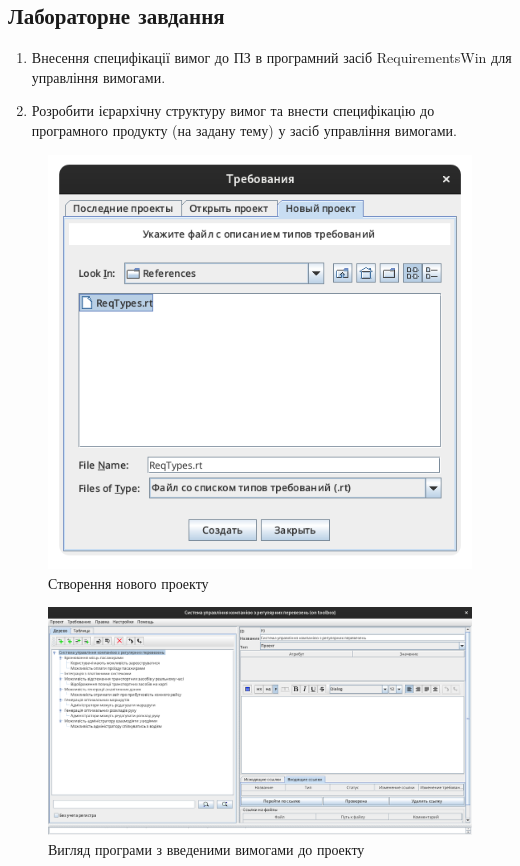 \documentclass[14pt]{extreport}
\begin{document}
\begin{normalsize}
	\section*{Лабораторне завдання}
	\begin{enumerate}
		\item Внесення специфікації вимог до ПЗ в
		програмний засіб RequirementsWin для управління вимогами.
		\item Розробити ієрархічну структуру вимог та внести специфікацію
		до програмного продукту (на задану тему) у засіб управління вимогами.
	\end{enumerate}
	
	\begin{figure}[H]
		\centering
		\includegraphics[scale=0.35]{1}
		\caption{Створення нового проекту}
	\end{figure}


\begin{figure}[H]
	\centering
	\includegraphics[scale=0.35]{2}
	\caption{Вигляд програми з введеними вимогами до проекту}
\end{figure}



\end{normalsize}
\end{document}

